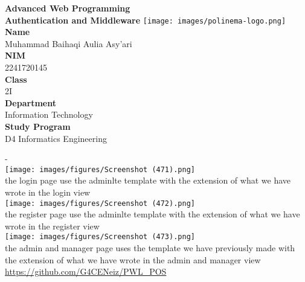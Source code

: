 \documentclass[12pt,titlepage]{article}
\newcommand{\vSubject}{Advanced Web Programming}
\newcommand{\vSubtitle}{Authentication and Middleware}
\newcommand{\vName}{Muhammad Baihaqi Aulia Asy'ari}
\newcommand{\vNIM}{2241720145}
\newcommand{\vClass}{2I}
\newcommand{\vDepartment}{Information Technology}
\newcommand{\vStudyProgram}{D4 Informatics Engineering}
\begin{document}
\begin{titlepage}
    \centering
    \vfill
    {\bfseries\LARGE
        \vSubject\\
        \vskip0.25cm
        \vSubtitle
    }
    \vfill
    \texttt{[image: images/polinema-logo.png]}
    \vfill
    {
        \textbf{Name}\\
        \vName\\
        \vskip0.5cm
        \textbf{NIM}\\
        \vNIM\\
        \vskip0.5cm
        \textbf{Class}\\
        \vClass\\
        \vskip0.5cm
        \textbf{Department}\\
        \vDepartment\\
        \vskip0.5cm
        \textbf{Study Program}\\
        \vStudyProgram
    }
\end{titlepage}
\newpage
-
\\
\texttt{[image: images/figures/Screenshot (471).png]} \\ the login page use the adminlte template with the extension of what we have wrote in the login view 
\\
\texttt{[image: images/figures/Screenshot (472).png]} \\ the register page use the adminlte template with the extension of what we have wrote in the register view 
\\
\texttt{[image: images/figures/Screenshot (473).png]} \\ the admin and manager page uses the template we have previously made with the extension of what we have wrote in the admin and manager view 
\\
\url{https://github.com/G4CENeiz/PWL_POS}
\end{document}
